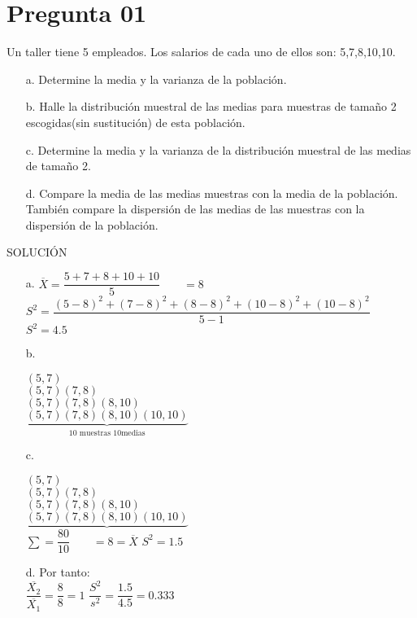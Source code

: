 \documentclass[10pt,a4paper]{article}
\begin{document}
\section{Pregunta 01}
Un taller tiene 5 empleados. Los salarios de cada uno de ellos son: 5,7,8,10,10.
\begin{itemize}
\item[a.] Determine la media y la varianza de la población.
\item[b.] Halle la distribución muestral de las medias para muestras de tamaño 2 escogidas(sin sustitución) de esta población.
\item[c.] Determine la media y la varianza de la distribución muestral de las medias de tamaño 2.
\item[d.] Compare la media de las medias muestras con la media de la población. También compare la dispersión de las medias de las muestras con la dispersión de la población.
\end{itemize}
SOLUCIÓN\\
\begin{itemize}
\item[a.]
$\overline{X} = \dfrac{5+7+8+10+10}{5} \qquad = 8$\\
\newline
$S^2 = \dfrac{(5-8)^2+(7-8)^2+(8-8)^2+(10-8)^2+(10-8)^2}{5-1}$\\
\newline
$S^2 = 4.5$
\item[b.]
 
\vspace{0.3cm}
$ $\\
\vspace{0.3cm}
$(5,7)$\\
\vspace{0.3cm}
$(5,7)(7,8)$\\
\vspace{0.3cm}
$(5,7)(7,8)(8,10)$\\
\vspace{0.3cm}
$\underbrace{(5,7)(7,8)(8,10)(10,10)}_{\mbox{10 muestras 10medias}}$\\
\item[c.]

\vspace{0.3cm}
$ $\\
\vspace{0.3cm}
$(5,7)$\\
\vspace{0.3cm}
$(5,7)(7,8)$\\
\vspace{0.3cm}
$(5,7)(7,8)(8,10)$\\
\vspace{0.3cm}
$\underbrace{(5,7)(7,8)(8,10)(10,10)}$\\
$\sum = \dfrac{80}{10}\qquad = 8 = \overline{X}$
$S^2 = 1.5$
\item[d.]
Por tanto:\\
\newline
$\dfrac{\overline{X_{2}}}{\overline{X_{1}}} = \dfrac{8}{8} = 1$
$\dfrac{S^2}{s^2} = \dfrac{1.5}{4.5} = 0.333$
\end{itemize}
\end{document}
